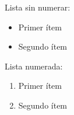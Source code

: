 
Lista sin numerar:

\begin{itemize}
  \item Primer ítem
  \item Segundo ítem
\end{itemize}

Lista numerada:

\begin{enumerate}
  \item Primer ítem
  \item Segundo ítem
\end{enumerate}

